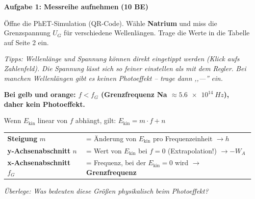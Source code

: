 \documentclass[11pt,a4paper]{article}
\newcommand{\lsg}[1]{\textcolor{loesung}{\textbf{#1}}}
\begin{document}
\vspace{0.5em}


\textbf{Aufgabe 1: Messreihe aufnehmen} \hfill \textbf{(10 BE)}

Öffne die PhET-Simulation (QR-Code). Wähle \textbf{Natrium} und miss die Grenzspannung $U_G$ für verschiedene Wellenlängen. Trage die Werte in die Tabelle auf Seite 2 ein.

\textit{Tipps: Wellenlänge und Spannung können direkt eingetippt werden (Klick aufs Zahlenfeld). Die Spannung lässt sich so feiner einstellen als mit dem Regler. Bei manchen Wellenlängen gibt es keinen Photoeffekt -- trage dann ,,---'' ein.}

\lsg{Bei gelb und orange: $f < f_G$ (Grenzfrequenz Na $\approx \SI{5,6e14}{Hz}$), daher kein Photoeffekt.}

\vspace{0.5em}


\begin{tcolorbox}[merkbox={Vorüberlegung: Was verrät uns eine Gerade?}]
Wenn $E_{\text{kin}}$ linear von $f$ abhängt, gilt: \quad $E_{\text{kin}} = m \cdot f + n$

\vspace{0.3em}
\begin{tabular}{@{}ll@{}}
\textbf{Steigung} $m$ & = Änderung von $E_{\text{kin}}$ pro Frequenzeinheit \lsg{$\rightarrow h$} \\
\textbf{y-Achsenabschnitt} $n$ & = Wert von $E_{\text{kin}}$ bei $f = 0$ (Extrapolation!) \lsg{$\rightarrow -W_A$} \\
\textbf{x-Achsenabschnitt} $f_G$ & = Frequenz, bei der $E_{\text{kin}} = 0$ wird \lsg{$\rightarrow$ Grenzfrequenz} \\
\end{tabular}

\vspace{0.3em}
\textit{Überlege: Was bedeuten diese Größen physikalisch beim Photoeffekt?}
\end{tcolorbox}

\newpage

\end{document}
